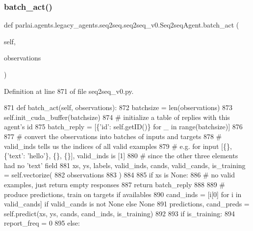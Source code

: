 \subsubsection{\texorpdfstring{batch\+\_\+act()}{batch\_act()}}
{\footnotesize\ttfamily def parlai.\+agents.\+legacy\+\_\+agents.\+seq2seq.\+seq2seq\+\_\+v0.\+Seq2seq\+Agent.\+batch\+\_\+act (\begin{DoxyParamCaption}\item[{}]{self,  }\item[{}]{observations }\end{DoxyParamCaption})}



Definition at line 871 of file seq2seq\+\_\+v0.\+py.


\begin{DoxyCode}
871     \textcolor{keyword}{def }batch\_act(self, observations):
872         batchsize = len(observations)
873         self.init\_cuda\_buffer(batchsize)
874         \textcolor{comment}{# initialize a table of replies with this agent's id}
875         batch\_reply = [\{\textcolor{stringliteral}{'id'}: self.getID()\} \textcolor{keywordflow}{for} \_ \textcolor{keywordflow}{in} range(batchsize)]
876 
877         \textcolor{comment}{# convert the observations into batches of inputs and targets}
878         \textcolor{comment}{# valid\_inds tells us the indices of all valid examples}
879         \textcolor{comment}{# e.g. for input [\{\}, \{'text': 'hello'\}, \{\}, \{\}], valid\_inds is [1]}
880         \textcolor{comment}{# since the other three elements had no 'text' field}
881         xs, ys, labels, valid\_inds, cands, valid\_cands, is\_training = self.vectorize(
882             observations
883         )
884 
885         \textcolor{keywordflow}{if} xs \textcolor{keywordflow}{is} \textcolor{keywordtype}{None}:
886             \textcolor{comment}{# no valid examples, just return empty responses}
887             \textcolor{keywordflow}{return} batch\_reply
888 
889         \textcolor{comment}{# produce predictions, train on targets if availables}
890         cand\_inds = [i[0] \textcolor{keywordflow}{for} i \textcolor{keywordflow}{in} valid\_cands] \textcolor{keywordflow}{if} valid\_cands \textcolor{keywordflow}{is} \textcolor{keywordflow}{not} \textcolor{keywordtype}{None} \textcolor{keywordflow}{else} \textcolor{keywordtype}{None}
891         predictions, cand\_preds = self.predict(xs, ys, cands, cand\_inds, is\_training)
892 
893         \textcolor{keywordflow}{if} is\_training:
894             report\_freq = 0
895         \textcolor{keywordflow}{else}:

\end{DoxyCode}

